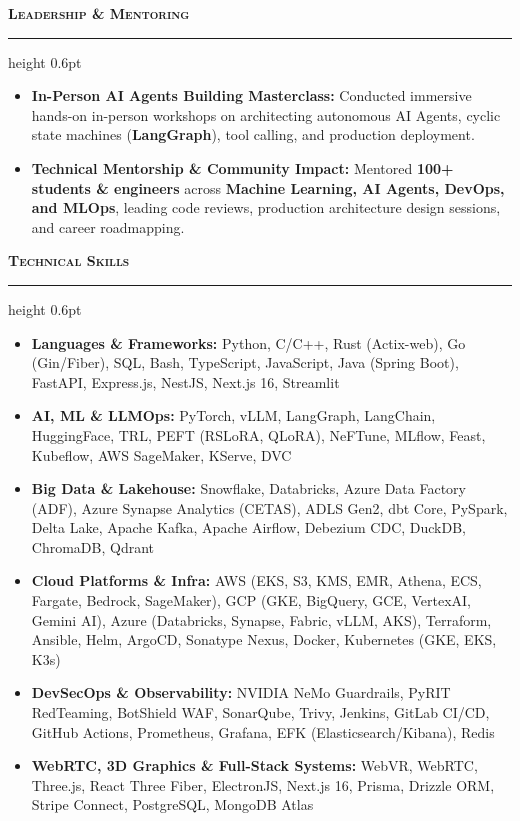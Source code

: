 \documentclass[9.5pt,a4paper]{article}
\newcommand{\resumesection}[1]{%
    \vspace{4.0pt}%
    {\color{burgundy}\scshape\bfseries\fontsize{10.0pt}{11.2pt}\selectfont #1}%
    \vspace{1.0pt}%
    \hrule height 0.6pt\relax%
    \vspace{2.5pt}%
}
\begin{document}
\resumesection{Leadership \& Mentoring}
\begin{itemize}
    \item \textbf{In-Person AI Agents Building Masterclass:} Conducted immersive hands-on in-person workshops on architecting autonomous AI Agents, cyclic state machines (\textbf{LangGraph}), tool calling, and production deployment.
    \item \textbf{Technical Mentorship \& Community Impact:} Mentored \textbf{100+ students \& engineers} across \textbf{Machine Learning, AI Agents, DevOps, and MLOps}, leading code reviews, production architecture design sessions, and career roadmapping.
\end{itemize}

\resumesection{Technical Skills}
\begin{itemize}
    \item \textbf{Languages \& Frameworks:} Python, C/C++, Rust (Actix-web), Go (Gin/Fiber), SQL, Bash, TypeScript, JavaScript, Java (Spring Boot), FastAPI, Express.js, NestJS, Next.js 16, Streamlit
    \item \textbf{AI, ML \& LLMOps:} PyTorch, vLLM, LangGraph, LangChain, HuggingFace, TRL, PEFT (RSLoRA, QLoRA), NeFTune, MLflow, Feast, Kubeflow, AWS SageMaker, KServe, DVC
    \item \textbf{Big Data \& Lakehouse:} Snowflake, Databricks, Azure Data Factory (ADF), Azure Synapse Analytics (CETAS), ADLS Gen2, dbt Core, PySpark, Delta Lake, Apache Kafka, Apache Airflow, Debezium CDC, DuckDB, ChromaDB, Qdrant
    \item \textbf{Cloud Platforms \& Infra:} AWS (EKS, S3, KMS, EMR, Athena, ECS, Fargate, Bedrock, SageMaker), GCP (GKE, BigQuery, GCE, VertexAI, Gemini AI), Azure (Databricks, Synapse, Fabric, vLLM, AKS), Terraform, Ansible, Helm, ArgoCD, Sonatype Nexus, Docker, Kubernetes (GKE, EKS, K3s)
    \item \textbf{DevSecOps \& Observability:} NVIDIA NeMo Guardrails, PyRIT RedTeaming, BotShield WAF, SonarQube, Trivy, Jenkins, GitLab CI/CD, GitHub Actions, Prometheus, Grafana, EFK (Elasticsearch/Kibana), Redis
    \item \textbf{WebRTC, 3D Graphics \& Full-Stack Systems:} WebVR, WebRTC, Three.js, React Three Fiber, ElectronJS, Next.js 16, Prisma, Drizzle ORM, Stripe Connect, PostgreSQL, MongoDB Atlas
\end{itemize}
\end{document}
